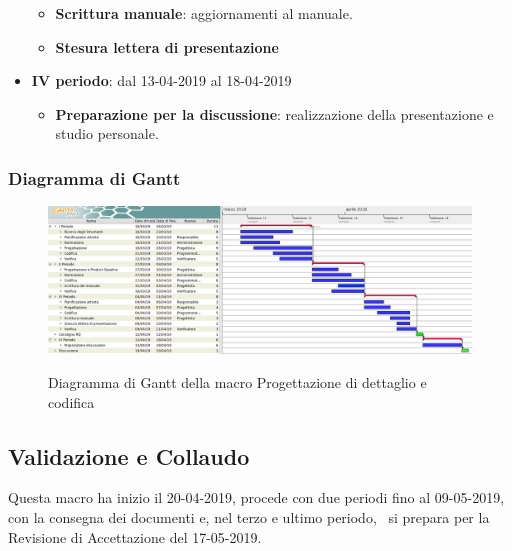 \begin{itemize}
\begin{itemize}
    	        \item \textbf{Scrittura manuale}: aggiornamenti al manuale.
    	        \item \textbf{Stesura lettera di presentazione}
        	\end{itemize}
        	\item \textbf{IV periodo}: dal 13-04-2019 al 18-04-2019
			\begin{itemize}
				\item \textbf{Preparazione per la discussione}: realizzazione della presentazione e studio personale.
        	\end{itemize}
        \end{itemize}

        \begin{landscape}
			\subsubsection{Diagramma di Gantt}        
			\begin{figure}[H]
					\centering
					\includegraphics[scale=0.44]{img/Progettazione_di_dettaglio_e_codifica.png}\\
					\caption{Diagramma di Gantt della macro Progettazione di dettaglio e codifica}
			\end{figure}
		\end{landscape}
		\newpage

        \subsection{Validazione e Collaudo}
        Questa macro ha inizio il 20-04-2019, procede con due periodi fino al 09-05-2019, con la consegna dei documenti e, nel terzo e ultimo periodo, \gruppo\ si
        prepara per la Revisione di Accettazione del 17-05-2019.

